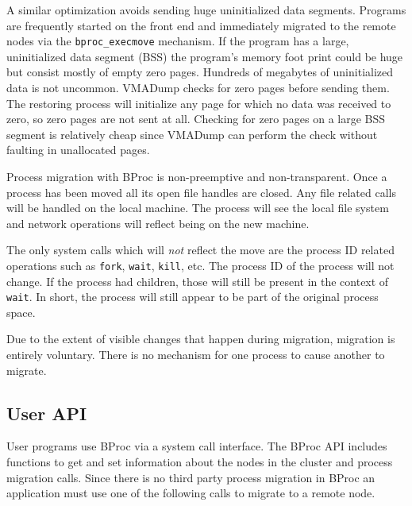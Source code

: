 A similar optimization avoids sending huge uninitialized data
segments.  Programs are frequently started on the front end and
immediately migrated to the remote nodes via the
\texttt{bproc\_execmove} mechanism.  If the program has a large,
uninitialized data segment (BSS) the program's memory foot print could
be huge but consist mostly of empty zero pages.  Hundreds of megabytes
of uninitialized data is not uncommon.  VMADump checks for zero pages
before sending them.  The restoring process will initialize any page
for which no data was received to zero, so zero pages are not sent at
all.  Checking for zero pages on a large BSS segment is relatively
cheap since VMADump can perform the check without faulting in
unallocated pages.

Process migration with BProc is non-preemptive and non-transparent.
Once a process has been moved all its open file handles are closed.  Any
file related calls will be handled on the local machine.  The process
will see the local file system and network operations will reflect
being on the new machine.

The only system calls which will \emph{not} reflect the move are the
process ID related operations such as \texttt{fork}, \texttt{wait},
\texttt{kill}, etc.  The process ID of the process will not change.
If the process had children, those will still be present in the
context of \texttt{wait}.  In short, the process will still appear
to be part of the original process space.

Due to the extent of visible changes that happen during migration,
migration is entirely voluntary.  There is no mechanism for one
process to cause another to migrate.

\subsection{User API}

User programs use BProc via a system call interface.  The BProc API
includes functions to get and set information about the nodes in the
cluster and process migration calls.  Since there is no third party
process migration in BProc an application must use one of the
following calls to migrate to a remote node.

